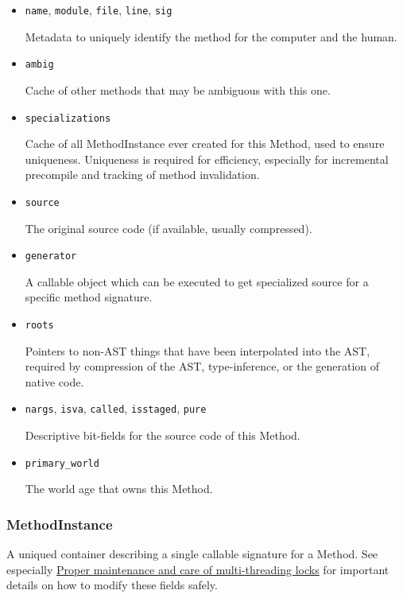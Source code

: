 \begin{itemize}
\item \texttt{name}, \texttt{module}, \texttt{file}, \texttt{line}, \texttt{sig}

Metadata to uniquely identify the method for the computer and the human.


\item \texttt{ambig}

Cache of other methods that may be ambiguous with this one.


\item \texttt{specializations}

Cache of all MethodInstance ever created for this Method, used to ensure uniqueness. Uniqueness is required for efficiency, especially for incremental precompile and tracking of method invalidation.


\item \texttt{source}

The original source code (if available, usually compressed).


\item \texttt{generator}

A callable object which can be executed to get specialized source for a specific method signature.


\item \texttt{roots}

Pointers to non-AST things that have been interpolated into the AST, required by compression of the AST, type-inference, or the generation of native code.


\item \texttt{nargs}, \texttt{isva}, \texttt{called}, \texttt{isstaged}, \texttt{pure}

Descriptive bit-fields for the source code of this Method.


\item \texttt{primary\_world}

The world age that {\textquotedbl}owns{\textquotedbl} this Method.

\end{itemize}


\hypertarget{2584833319372808594}{}


\subsubsection{MethodInstance}



A unique{\textquotesingle}d container describing a single callable signature for a Method. See especially \hyperlink{17047801949293328593}{Proper maintenance and care of multi-threading locks} for important details on how to modify these fields safely.



